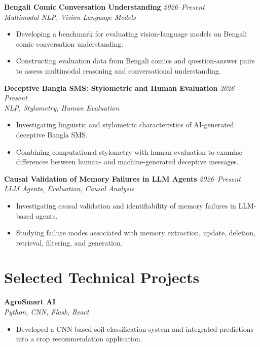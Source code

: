 \documentclass[a4paper,11pt]{article}
\newcommand{\project}[3]{
  \textbf{#1} \hfill \textit{#3}\\
  \textit{#2}\\[-0.25em]
}
\begin{document}
\project
{Bengali Comic Conversation Understanding}
{Multimodal NLP, Vision-Language Models}
{2026--Present}

\begin{itemize}
    \item Developing a benchmark for evaluating vision-language models on
    Bengali comic conversation understanding.
    \item Constructing evaluation data from Bengali comics and question-answer
    pairs to assess multimodal reasoning and conversational understanding.
\end{itemize}

\project
{Deceptive Bangla SMS: Stylometric and Human Evaluation}
{NLP, Stylometry, Human Evaluation}
{2026--Present}

\begin{itemize}
    \item Investigating linguistic and stylometric characteristics of
    AI-generated deceptive Bangla SMS.
    \item Combining computational stylometry with human evaluation to examine
    differences between human- and machine-generated deceptive messages.
\end{itemize}

\project
{Causal Validation of Memory Failures in LLM Agents}
{LLM Agents, Evaluation, Causal Analysis}
{2026--Present}

\begin{itemize}
    \item Investigating causal validation and identifiability of memory
    failures in LLM-based agents.
    \item Studying failure modes associated with memory extraction, update,
    deletion, retrieval, filtering, and generation.
\end{itemize}

\section*{Selected Technical Projects}

\project
{AgroSmart AI}
{Python, CNN, Flask, React}
{}

\begin{itemize}
    \item Developed a CNN-based soil classification system and integrated
    predictions into a crop recommendation application.
\end{itemize}
\end{document}
